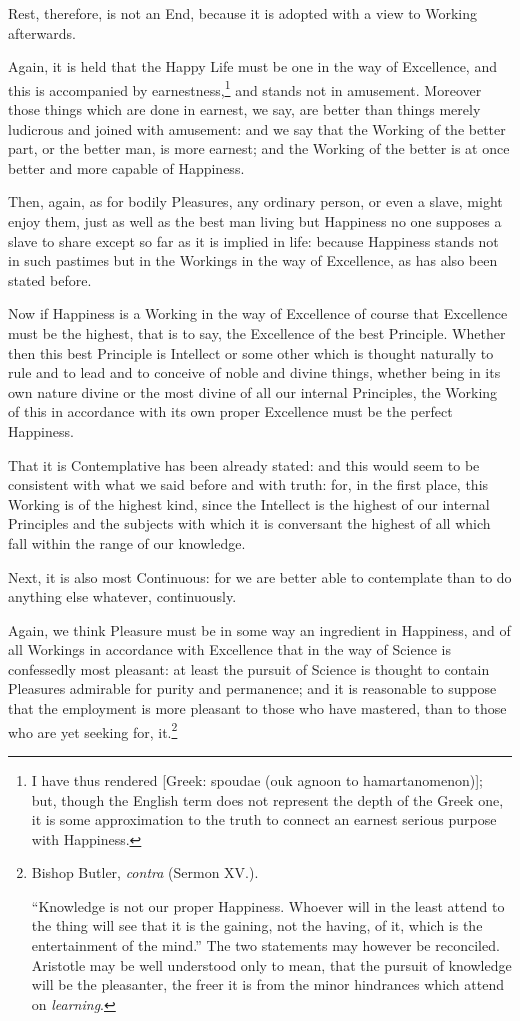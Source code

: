 Rest, therefore, is not an End, because it is adopted with a view to Working
afterwards.

Again, it is held that the Happy Life must be one in the way of Excellence, and
this is accompanied by earnestness,\footnote{I have thus rendered [Greek: spoudae (ouk agnoon to hamartanomenon)]; but,
though the English term does not represent the depth of the Greek one, it is
some approximation to the truth to connect an earnest serious purpose with
Happiness.}
and stands not in amusement. Moreover those things which are done in earnest,
we say, are better than things merely ludicrous and joined with amusement: and
we say that the Working of the better part, or the better man, is more earnest;
and the Working of the better is at once better and more capable of Happiness.

Then, again, as for bodily Pleasures, any ordinary person, or even a slave,
might enjoy them, just as well as the best man living but Happiness no one
supposes a slave to share except so far as it is implied in life: because
Happiness stands not in such pastimes but in the Workings in the way of
Excellence, as has also been stated before.


Now if Happiness is a Working in the way of Excellence of course that
Excellence must be the highest, that is to say, the Excellence of the best
Principle. Whether then this best Principle is Intellect or some other which is
thought naturally to rule and to lead and to conceive of noble and divine
things, whether being in its own nature divine or the most divine of all our
internal Principles, the Working of this in accordance with its own proper
Excellence must be the perfect Happiness.

That it is Contemplative has been already stated: and this would seem to be
consistent with what we said before and with truth: for, in the first place,
this Working is of the highest kind, since the Intellect is the highest of our
internal Principles and the subjects with which it is conversant the highest of
all which fall within the range of our knowledge.

Next, it is also most Continuous: for we are better able to contemplate than to
do anything else whatever, continuously.

Again, we think Pleasure must be in some way an ingredient in Happiness, and of
all Workings in accordance with Excellence that in the way of Science is
confessedly most pleasant: at least the pursuit of Science is thought to
contain Pleasures admirable for purity and permanence; and it is reasonable to
suppose that the employment is more pleasant to those who have mastered, than
to those who are yet seeking for, it.\footnote{Bishop Butler, \emph{contra} (Sermon XV.).

“Knowledge is not our proper Happiness. Whoever will in the least
attend to the thing will see that it is the gaining, not the having, of it,
which is the entertainment of the mind.” The two statements may however
be reconciled. Aristotle may be well understood only to mean, that the pursuit
of knowledge will be the pleasanter, the freer it is from the minor hindrances
which attend on \emph{learning}.}

